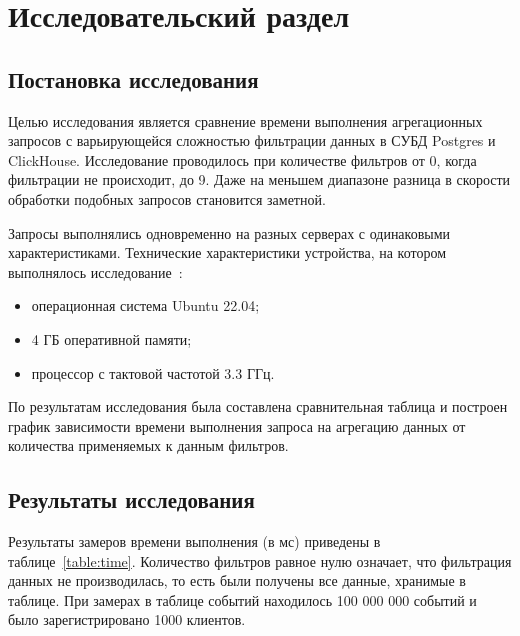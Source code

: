 \chapter{Исследовательский раздел}


\section{Постановка исследования}
Целью исследования является сравнение времени выполнения агрегационных запросов с варьирующейся сложностью фильтрации данных в СУБД Postgres и ClickHouse. Исследование проводилось при количестве фильтров от 0, когда фильтрации не происходит, до 9. Даже на меньшем диапазоне разница в скорости обработки подобных запросов становится заметной.

Запросы выполнялись одновременно на разных серверах с одинаковыми характеристиками. Технические характеристики устройства, на котором выполнялось исследование~\cite{bib37}:
\begin{itemize}
	\item операционная система Ubuntu 22.04;
	\item 4 ГБ оперативной памяти;
	\item процессор с тактовой частотой 3.3 ГГц.
\end{itemize}

По результатам исследования была составлена сравнительная таблица и построен график зависимости времени выполнения запроса на агрегацию данных от количества применяемых к данным фильтров.

\section{Результаты исследования}
Результаты замеров времени выполнения (в мс) приведены в таблице~\ref{table:time}. Количество фильтров равное нулю означает, что фильтрация данных не производилась, то есть были получены все данные, хранимые в таблице. При замерах в таблице событий находилось 100 000 000 событий и было зарегистрировано 1000 клиентов.

\newpage

